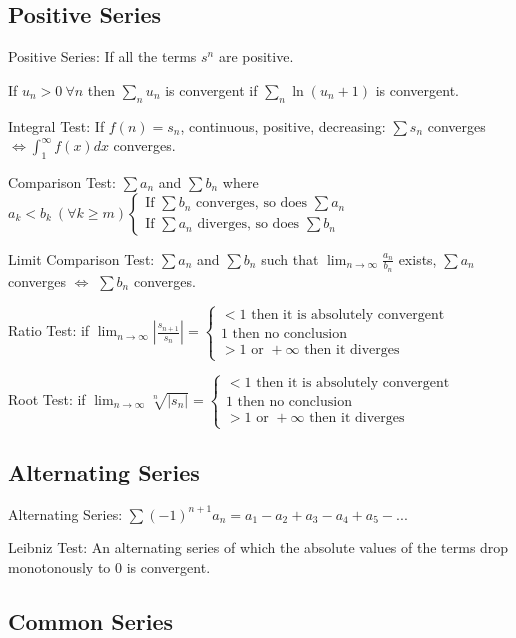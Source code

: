\subsection{Positive Series}
Positive Series: If all the terms $ s^n $ are positive.

If $u_n>0~\forall n$ then $\sum\limits_n u_n$ is convergent if 
$\sum\limits_n\ln(u_n+1)$ is convergent.

Integral Test: If $ f(n) = s_n $, continuous, positive, decreasing: $\sum s_n$ converges $ \Leftrightarrow \int_{1}^{\infty}f(x)dx $ converges.

Comparison Test: $\sum a_n$ and $\sum b_n$ where $a_k<b_k ~ (\forall k\ge m) 
\begin{cases}
\text{If } \sum b_n \text{ converges, so does } \sum a_n \\
\text{If } \sum a_n \text{ diverges, so does } \sum b_n
\end{cases}
$

Limit Comparison Test: $\sum a_n$ and $\sum b_n$ such that $ \lim_{n\rightarrow\infty} \frac{a_n}{b_n}$ exists, $\sum a_n$ converges $\Leftrightarrow$ $\sum b_n$ converges.

Ratio Test: if $\lim_{n\rightarrow \infty}\left|\frac{s_{n+1}}{s_n}\right| = \begin{cases}
<1 \text{ then it is absolutely convergent} \\
1 \text{ then no conclusion} \\
>1 \text{ or } +\infty \text{ then it diverges}
\end{cases}
$

Root Test: if  $\lim_{n\rightarrow \infty} \sqrt[n]{\left|s_n\right|} = \begin{cases}
<1 \text{ then it is absolutely convergent} \\
1 \text{ then no conclusion} \\
>1 \text{ or } +\infty \text{ then it diverges}
\end{cases}
$

\subsection{Alternating Series}
Alternating Series: $ \sum(-1)^{n+1}a_n=a_1-a_2+a_3-a_4+a_5-... $

Leibniz Test: An alternating series of which the absolute values of the terms drop
monotonously to 0 is convergent.

\subsection{Common Series}
